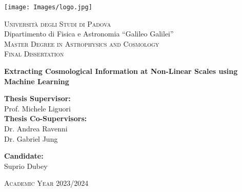 \begin{titlepage}
    \centering
    \vspace*{5mm}
    \texttt{[image: Images/logo.jpg]}
    
    \vspace{10mm}
    {\huge \textsc{Università degli Studi di Padova}}\\
    
    \vspace{5mm}
    {\large Dipartimento di Fisica e Astronomia ``Galileo Galilei''} \\
    
    \vspace{10mm}
    {\Large \textsc{Master Degree in Astrophysics and Cosmology}}\\
    
    \vspace{15mm}
    {\Large \textsc{Final Dissertation}}\\
    
    \vspace{20mm}
    \begin{spacing}{1.5}
    {\LARGE \textbf{Extracting Cosmological Information at Non-Linear Scales using Machine Learning}}\\
    \end{spacing}
    
    \vspace{15mm}
    \noindent
    \begin{minipage}[t]{0.6\textwidth}
        \Large \textbf{Thesis Supervisor:} \\
        \Large Prof. Michele Liguori \\
    
        \Large \textbf{Thesis Co-Supervisors:} \\
        \Large Dr. Andrea Ravenni \\
        \Large Dr. Gabriel Jung \\
    \end{minipage}
    \begin{minipage}[t]{0.3\textwidth}
        \raggedleft
        \Large \textbf{Candidate:} \\
        \Large Suprio Dubey \\
    \end{minipage}
    
    \vspace{20mm}
    {\large \textsc{Academic Year 2023/2024}}
\end{titlepage}
